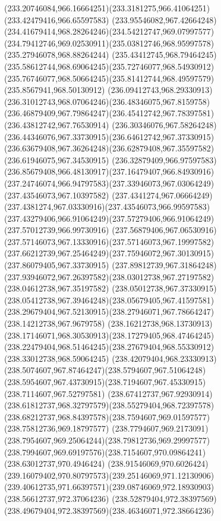 {{\curveto(233.20746084,966.16664251)(233.3181275,966.41064251)(233.42479416,966.65597583)
\curveto(233.95546082,967.42664248)(234.41679414,968.28264246)(234.54212747,969.07997577)
\curveto(234.79412746,969.02530911)(235.03812746,968.95997578)(235.27946078,968.88264244)
\curveto(235.43412745,968.79464245)(235.58612744,968.69064245)(235.72746077,968.54930912)
\curveto(235.76746077,968.50664245)(235.81412744,968.49597579)(235.8567941,968.50130912)
\curveto(236.09412743,968.29330913)(236.31012743,968.07064246)(236.48346075,967.8159758)
\curveto(236.46879409,967.79864247)(236.45412742,967.78397581)(236.43812742,967.76530914)
\curveto(236.30346076,967.58264248)(236.44346076,967.33730915)(236.64612742,967.37330915)
\curveto(236.63679408,967.36264248)(236.62879408,967.35597582)(236.61946075,967.34530915)
\curveto(236.32879409,966.97597583)(236.85679408,966.48130917)(237.16479407,966.84930916)
\curveto(237.24746074,966.94797583)(237.33946073,967.03064249)(237.43546073,967.10397582)
\curveto(237.4341274,967.06664249)(237.4381274,967.03330916)(237.43546073,966.99597583)
\curveto(237.43279406,966.91064249)(237.57279406,966.91064249)(237.57012739,966.99730916)
\curveto(237.56879406,967.06530916)(237.57146073,967.13330916)(237.57146073,967.19997582)
\curveto(237.66212739,967.25464249)(237.75946072,967.30130915)(237.86079405,967.33730915)
\lineto(237.89812739,967.31864248)
\curveto(237.93946072,967.26397582)(238.03012738,967.27197582)(238.04612738,967.35197582)
\curveto(238.05012738,967.37330915)(238.05412738,967.39464248)(238.05679405,967.41597581)
\curveto(238.29679404,967.52130915)(238.27946071,967.78664247)(238.14212738,967.9679758)
\curveto(238.16212738,968.13730913)(238.17146071,968.30530913)(238.17279405,968.47464245)
\curveto(238.22479404,968.51464245)(238.27679404,968.55330912)(238.33012738,968.59064245)
\curveto(238.42079404,968.23330913)(238.5074607,967.87464247)(238.5794607,967.51064248)
\curveto(238.5954607,967.43730915)(238.7194607,967.45330915)(238.7114607,967.52797581)
\curveto(238.67412737,967.92930914)(238.61812737,968.32797579)(238.55279404,968.72397578)
\curveto(238.68212737,968.84397578)(238.7594607,969.01597577)(238.75812736,969.18797577)
\curveto(238.7794607,969.2173091)(238.7954607,969.25064244)(238.79812736,969.29997577)
\curveto(238.7994607,969.69197576)(238.7154607,970.09864241)(238.63012737,970.4946424)
\curveto(238.91546069,970.6026424)(239.16079402,970.80797573)(239.25146069,971.12130906)
\curveto(239.40612735,971.66397571)(239.08746069,972.18930903)(238.56612737,972.37064236)
\curveto(238.52879404,972.38397569)(238.49679404,972.38397569)(238.46346071,972.38664236)
}}
